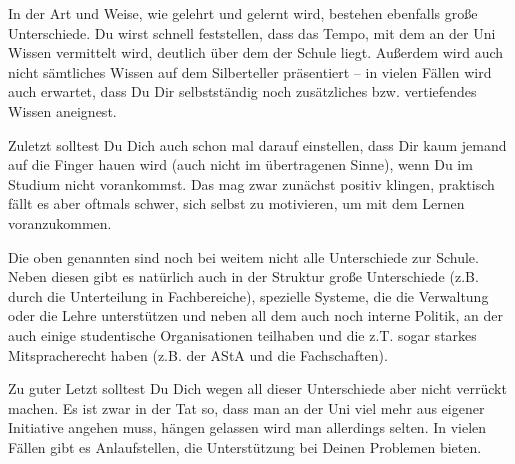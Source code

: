 {    In der Art und Weise, wie gelehrt und gelernt wird, bestehen ebenfalls große Unterschiede. Du wirst schnell feststellen, dass das Tempo, mit dem an der Uni Wissen vermittelt wird, deutlich über dem der Schule liegt. Außerdem wird auch nicht sämtliches Wissen auf dem Silberteller präsentiert – in vielen Fällen wird auch erwartet, dass Du Dir selbstständig noch zusätzliches bzw. vertiefendes Wissen aneignest.

    Zuletzt solltest Du Dich auch schon mal darauf einstellen, dass Dir kaum jemand auf die Finger hauen wird (auch nicht im übertragenen Sinne), wenn Du im Studium nicht vorankommst. Das mag zwar zunächst positiv klingen, praktisch fällt es aber oftmals schwer, sich selbst zu motivieren, um mit dem Lernen voranzukommen.

    Die oben genannten sind noch bei weitem nicht alle Unterschiede zur Schule. Neben diesen gibt es natürlich auch in der Struktur große Unterschiede (z.B. durch die Unterteilung in Fachbereiche), spezielle Systeme, die die Verwaltung oder die Lehre unterstützen und neben all dem auch noch interne Politik, an der auch einige studentische Organisationen teilhaben und die z.T. sogar starkes Mitspracherecht haben (z.B. der AStA und die Fachschaften).

    Zu guter Letzt solltest Du Dich wegen all dieser Unterschiede aber nicht verrückt machen. Es ist zwar in der Tat so, dass man an der Uni viel mehr aus eigener Initiative angehen muss, hängen gelassen wird man allerdings selten. In vielen Fällen gibt es Anlaufstellen, die Unterstützung bei Deinen Problemen bieten.
}
{}
